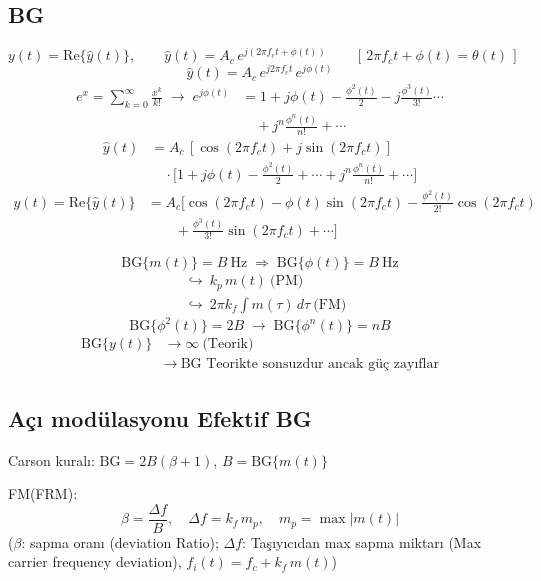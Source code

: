 \documentclass[11pt,a4paper]{article}
\begin{document}
\subsection{BG}
\[ y(t)=\mathrm{Re}\{\hat y(t)\},\qquad \hat y(t)=A_c\, e^{j(2\pi f_c t+\phi(t))} \qquad [\,2\pi f_c t+\phi(t)=\theta(t)\,] \]
\[ \hat y(t)=A_c\, e^{j2\pi f_c t}\, e^{j\phi(t)} \]
\begin{align*}
e^{x}=\sum_{k=0}^{\infty}\frac{x^k}{k!} \;\to\; e^{j\phi(t)}&=1+j\phi(t)-\frac{\phi^2(t)}{2}-j\frac{\phi^3(t)}{3!}\cdots\\
&\quad+j^n\frac{\phi^n(t)}{n!}+\cdots
\end{align*}
\begin{align*}
\hat y(t)&=A_c\,[\cos(2\pi f_c t)+j\sin(2\pi f_c t)]\\
&\quad\cdot\Big[1+j\phi(t)-\frac{\phi^2(t)}{2}+\cdots+j^n\frac{\phi^n(t)}{n!}+\cdots\Big]
\end{align*}
\begin{align*}
y(t)=\mathrm{Re}\{\hat y(t)\}&=A_c\Big[\cos(2\pi f_c t)-\phi(t)\sin(2\pi f_c t)-\frac{\phi^2(t)}{2!}\cos(2\pi f_c t)\\
&\qquad+\frac{\phi^3(t)}{3!}\sin(2\pi f_c t)+\cdots\Big]
\end{align*}

\[ \mathrm{BG}\{m(t)\}=B\ \mathrm{Hz} \;\Rightarrow\; \mathrm{BG}\{\phi(t)\}=B\ \mathrm{Hz} \]
\begin{align*}
&\hookrightarrow\ k_p\, m(t)\ \text{(PM)}\\
&\hookrightarrow\ 2\pi k_f\int m(\tau)\,d\tau\ \text{(FM)}
\end{align*}
\[ \mathrm{BG}\{\phi^2(t)\}=2B \;\longrightarrow\; \mathrm{BG}\{\phi^n(t)\}=nB \]
\begin{align*}
\mathrm{BG}\{y(t)\}&\to\infty\ \text{(Teorik)}\\
&\to\ \text{BG Teorikte sonsuzdur ancak güç zayıflar}
\end{align*}

\subsection{Açı modülasyonu Efektif BG}
Carson kuralı: $\mathrm{BG}=2B(\beta+1)$, $B=\mathrm{BG}\{m(t)\}$

FM(FRM):
\[ \beta=\frac{\Delta f}{B},\quad \Delta f=k_f\, m_p,\quad m_p=\max|m(t)| \]
($\beta$: sapma oranı (deviation Ratio); $\Delta f$: Taşıyıcıdan max sapma miktarı (Max carrier frequency deviation), $f_i(t)=f_c+k_f\,m(t)$)
\end{document}
